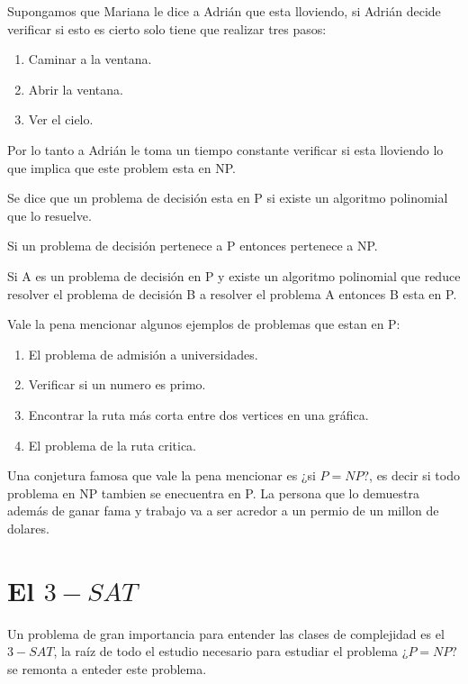 \begin{eje}
Supongamos que Mariana le dice a Adrián que esta lloviendo, si Adrián decide verificar si esto es cierto solo tiene que realizar tres pasos:
\begin{enumerate}
\item Caminar a la ventana.
\item Abrir la ventana.
\item Ver el cielo.
\end{enumerate}
Por lo tanto a Adrián le toma un tiempo constante verificar si esta lloviendo lo que implica que este problem esta en NP.
\end{eje}
\begin{dfn}
Se dice que un problema de decisión esta en P si existe un algoritmo polinomial que lo resuelve.
\end{dfn}
\begin{obs}[$P  \subseteq NP$]
Si un problema de decisión pertenece a P entonces pertenece a NP.
\end{obs}
\begin{obs}
\label{pp eq}
Si A es un problema de decisión en P y existe un algoritmo polinomial que reduce resolver el problema de decisión B a resolver el problema A entonces B esta en P.
\end{obs}

Vale la pena mencionar algunos ejemplos de problemas que estan en P:
\begin{enumerate}
\item El problema de admisión a universidades.
\item Verificar si un numero es primo.
\item Encontrar la ruta más corta entre dos vertices en una gráfica.
\item El problema de la ruta critica. 
\end{enumerate}

Una conjetura famosa que vale la pena mencionar es ¿si $P=NP$?, es decir si todo problema en NP tambien se enecuentra en P. La persona que lo demuestra además de ganar fama y trabajo va a ser acredor a un permio de un millon de dolares. 

\section{El $3-SAT$}
Un problema de gran importancia para entender las clases de complejidad es el $3-SAT$, la raíz de todo el estudio necesario para estudiar el problema ¿$P=NP?$ se remonta a enteder este problema. 
\begin{dfn} 
\end{dfn}


